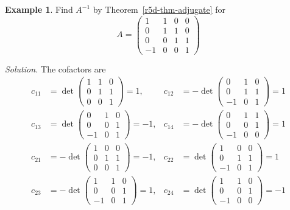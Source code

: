 \documentclass[12pt]{article}
\theoremstyle{definition}
\newtheorem{example}[theorem]{Example}
\begin{document}
\begin{example}\label{r5d-exm-adjugate}
Find \(A^{-1}\) by Theorem~\ref{r5d-thm-adjugate} for
\[
A=\begin{pmatrix}1&1&0&0\\0&1&1&0\\0&0&1&1\\-1&0&0&1\end{pmatrix}
\]

\textit{Solution.} The cofactors are
\[
\begin{aligned}
c_{11}&=\det\left(\begin{smallmatrix}1&1&0\\0&1&1\\0&0&1\end{smallmatrix}\right)=1,&
c_{12}&=-\det\left(\begin{smallmatrix}0&1&0\\0&1&1\\-1&0&1\end{smallmatrix}\right)=1\\
c_{13}&=\det\left(\begin{smallmatrix}0&1&0\\0&0&1\\-1&0&1\end{smallmatrix}\right)=-1,&
c_{14}&=-\det\left(\begin{smallmatrix}0&1&1\\0&0&1\\-1&0&0\end{smallmatrix}\right)=1\\
c_{21}&=-\det\left(\begin{smallmatrix}1&0&0\\0&1&1\\0&0&1\end{smallmatrix}\right)=-1,&
c_{22}&=\det\left(\begin{smallmatrix}1&0&0\\0&1&1\\-1&0&1\end{smallmatrix}\right)=1\\
c_{23}&=-\det\left(\begin{smallmatrix}1&1&0\\0&0&1\\-1&0&1\end{smallmatrix}\right)=1,&
c_{24}&=\det\left(\begin{smallmatrix}1&1&0\\0&0&1\\-1&0&0\end{smallmatrix}\right)=-1\\

\end{aligned}\]
\end{example}
\end{document}
